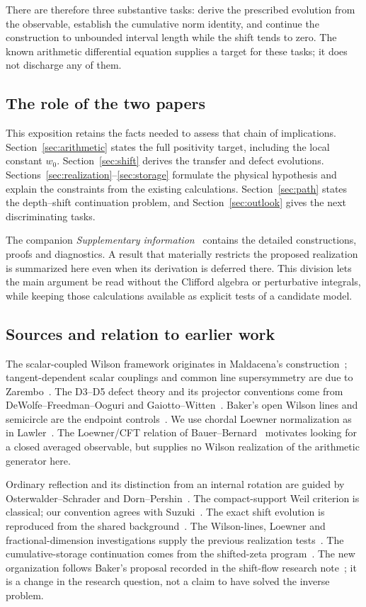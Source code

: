 There are therefore three substantive tasks: derive the prescribed
evolution from the observable, establish the cumulative norm
identity, and continue the construction to unbounded interval
length while the shift tends to zero. The known arithmetic
differential equation supplies a target for these tasks; it does
not discharge any of them.

\subsection{The role of the two papers}

This exposition retains the facts needed to assess that chain of
implications. Section~\ref{sec:arithmetic} states the full positivity
target, including the local constant $w_0$.
Section~\ref{sec:shift} derives the transfer and defect evolutions.
Sections~\ref{sec:realization}--\ref{sec:storage} formulate the
physical hypothesis and explain the constraints from the existing
calculations. Section~\ref{sec:path} states the depth--shift
continuation problem, and Section~\ref{sec:outlook} gives the next
discriminating tasks.

The companion \emph{Supplementary information}~\cite{Supplement}
contains the detailed constructions, proofs and diagnostics.
A result that materially restricts the proposed realization is
summarized here even when its derivation is deferred there.
This division lets the main argument be read without the Clifford
algebra or perturbative integrals, while keeping those calculations
available as explicit tests of a candidate model.

\subsection{Sources and relation to earlier work}

The scalar-coupled Wilson framework originates in
Maldacena's construction~\cite{Maldacena}; tangent-dependent scalar
couplings and common line supersymmetry are due to
Zarembo~\cite{Zarembo}. The D3--D5 defect theory and its projector
conventions come from DeWolfe--Freedman--Ooguri and
Gaiotto--Witten~\cite{DFO,GW}. Baker's open Wilson lines and
semicircle are the endpoint controls~\cite{Baker}.
We use chordal Loewner normalization as in Lawler~\cite{Lawler}.
The Loewner/CFT relation of Bauer--Bernard~\cite{BauerBernard}
motivates looking for a closed averaged observable, but supplies
no Wilson realization of the arithmetic generator here.

Ordinary reflection and its distinction from an internal rotation
are guided by Osterwalder--Schrader and
Dorn--Pershin~\cite{OS,DP}. The compact-support Weil criterion is
classical; our convention agrees with Suzuki~\cite{Suzuki}.
The exact shift evolution is reproduced from the shared
background~\cite{SharedBackground}. The Wilson-lines, Loewner and
fractional-dimension investigations supply the previous realization
tests~\cite{ParentWilson,ParentLoewner,ParentFractional}.
The cumulative-storage continuation comes from the shifted-zeta
program~\cite{CumulativePath,AdaptivePath}. The new organization
follows Baker's proposal recorded in the shift-flow research
note~\cite{ShiftFlowNote}; it is a change in the research question,
not a claim to have solved the inverse problem.
